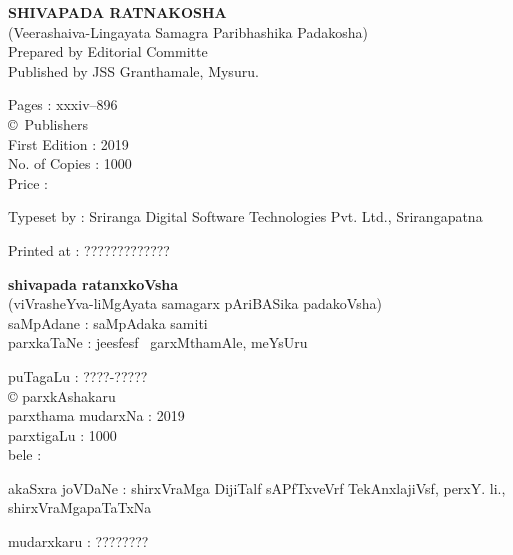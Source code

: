 \thispagestyle{empty}
\noindent
{\rm\sf\bfseries SHIVAPADA RATNAKOSHA}\\[5pt]
{\rm (Veerashaiva-Lingayata Samagra Paribhashika Padakosha)}\\[4pt]
{\rm Prepared by Editorial Committe}\\[4pt]
{\rm Published by JSS Granthamale, Mysuru.}

\vspace{1cm}

\noindent
{\rm Pages : xxxiv--896}\\[7pt]
{\rm \copyright \ Publishers}\\[7pt]
{\rm First Edition : 2019}\\[7pt]
{\rm No. of Copies : 1000}\\[7pt]
{\rm Price :} \rupee

\bigskip

\noindent
{\rm Typeset by : Sriranga Digital Software Technologies Pvt. Ltd., Srirangapatna}

\medskip

\noindent
{\rm Printed at : ?????????????}

\vfill

\noindent
{\bf\large shivapada ratanxkoVsha}\\[5pt]
(viVrasheYva-liMgAyata samagarx pAriBASika padakoVsha)\\[5pt]
saMpAdane : saMpAdaka samiti\\[4pt]
parxkaTaNe : je{esf}{esf} \ garxMthamAle, meYsUru\\

\vspace{1cm}

\noindent
puTagaLu : ????-?????\\[3pt]
{\rm \copyright} parxkAshakaru\\[7pt]
parxthama mudarxNa : 2019\\[7pt]
parxtigaLu : 1000\\[10pt]
bele : \rupee

\bigskip

\noindent
akaSxra joVDaNe : shirxVraMga DijiTalf sAPfTxveVrf TekAnxlajiVsf, perxY. li., shirxVraMgapaTaTxNa

\medskip

\noindent
mudarxkaru : ????????

\newpage

\thispagestyle{empty}

\phantom{a}

\vfill

